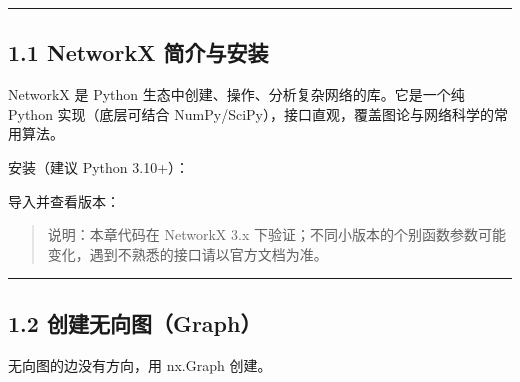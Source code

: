 \begin{center}\rule{0.5\linewidth}{0.5pt}\end{center}

\subsection{1.1 NetworkX
简介与安装}\label{networkx-ux7b80ux4ecbux4e0eux5b89ux88c5}

NetworkX 是 Python 生态中创建、操作、分析复杂网络的库。它是一个纯 Python
实现（底层可结合 NumPy/SciPy），接口直观，覆盖图论与网络科学的常用算法。

安装（建议 Python 3.10+）：

\begin{Shaded}
\begin{Highlighting}[]
\end{Highlighting}
\end{Shaded}

导入并查看版本：

\begin{Shaded}
\begin{Highlighting}[]
\end{Highlighting}
\end{Shaded}

\begin{Shaded}
\begin{Highlighting}[]
\end{Highlighting}
\end{Shaded}

\begin{quote}
说明：本章代码在 NetworkX 3.x
下验证；不同小版本的个别函数参数可能变化，遇到不熟悉的接口请以官方文档为准。
\end{quote}

\begin{center}\rule{0.5\linewidth}{0.5pt}\end{center}

\subsection{1.2
创建无向图（Graph）}\label{ux521bux5efaux65e0ux5411ux56fegraph}

无向图的边没有方向，用 nx.Graph 创建。

